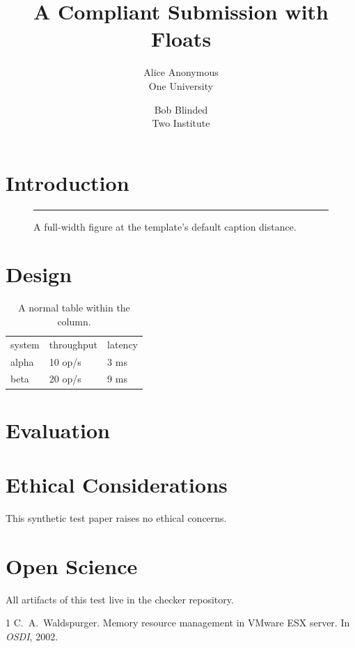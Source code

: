 \documentclass[letterpaper,twocolumn,10pt]{article}
\date{}
\title{\Large \bf A Compliant Submission with Floats}
\author{{\rm Alice Anonymous}\\One University \and {\rm Bob Blinded}\\Two Institute}
\begin{document}
\maketitle

\begin{abstract}
\lipsum[1][1-5]
\end{abstract}

\section{Introduction}
\lipsum[2-3]

\begin{figure}[t]
  \centering
  \rule{6.8in}{1.2in}
  \caption{A full-width figure at the template's default caption distance.}
  \label{fig:wide}
\end{figure}

\section{Design}
\lipsum[4-5]

\begin{table}[t]
  \centering
  \begin{tabular}{lll}
    system & throughput & latency \\
    alpha  & 10 op/s    & 3 ms    \\
    beta   & 20 op/s    & 9 ms    \\
  \end{tabular}
  \caption{A normal table within the column.}
  \label{tab:normal}
\end{table}

\section{Evaluation}
\lipsum[6-8]

\appendix
\section*{Ethical Considerations}
This synthetic test paper raises no ethical concerns.

\section*{Open Science}
All artifacts of this test live in the checker repository.

\begin{thebibliography}{1}
 C.~A.\ Waldspurger. Memory resource management in VMware ESX
  server. In \emph{OSDI}, 2002.
\end{thebibliography}
\end{document}
